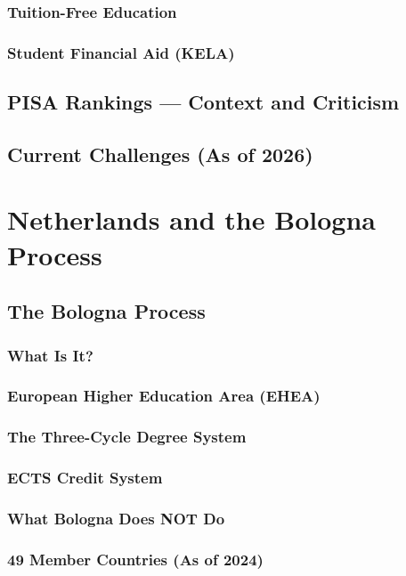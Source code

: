 \subsection{Tuition-Free Education}
\subsection{Student Financial Aid (KELA)}

\section{PISA Rankings --- Context and Criticism}
\section{Current Challenges (As of 2026)}


\chapter{Netherlands and the Bologna Process}

\section{The Bologna Process}
\subsection{What Is It?}
\subsection{European Higher Education Area (EHEA)}
\subsection{The Three-Cycle Degree System}
\subsection{ECTS Credit System}
\subsection{What Bologna Does NOT Do}
\subsection{49 Member Countries (As of 2024)}

